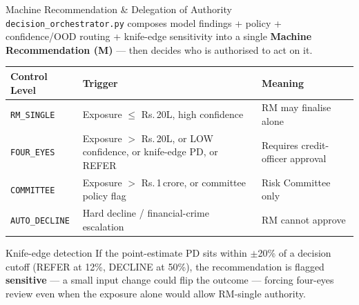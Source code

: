 \documentclass[9pt,aspectratio=169]{beamer}
\begin{document}
\begin{frame}{Machine Recommendation \& Delegation of Authority}
\vspace{-2pt}
{\footnotesize \texttt{decision\_orchestrator.py} composes model findings + policy +
confidence/OOD routing + knife-edge sensitivity into a single \textbf{Machine Recommendation (M)}
--- then decides who is authorised to act on it.}\\[6pt]
\begin{center}
\footnotesize
\begin{tabular}{lp{6.0cm}p{4.4cm}}
  \toprule
  \textbf{Control Level} & \textbf{Trigger} & \textbf{Meaning}\\
  \midrule
  \texttt{RM\_SINGLE}   & Exposure $\leq$ Rs.\,20L, high confidence & RM may finalise alone\\
  \texttt{FOUR\_EYES}   & Exposure $>$ Rs.\,20L, or LOW confidence, or knife-edge PD, or REFER & Requires credit-officer approval\\
  \texttt{COMMITTEE}    & Exposure $>$ Rs.\,1\,crore, or committee policy flag & Risk Committee only\\
  \texttt{AUTO\_DECLINE} & Hard decline / financial-crime escalation & RM cannot approve\\
  \bottomrule
\end{tabular}
\end{center}
\vspace{6pt}
\begin{alertblock}{Knife-edge detection}
  \footnotesize
  If the point-estimate PD sits within $\pm$20\% of a decision cutoff (REFER at 12\%, DECLINE at
  50\%), the recommendation is flagged \textbf{sensitive} --- a small input change could flip the
  outcome --- forcing four-eyes review even when the exposure alone would allow RM-single authority.
\end{alertblock}
\end{frame}
\end{document}
